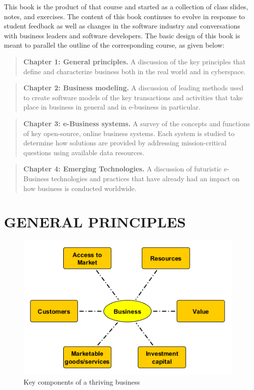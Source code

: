 \documentclass[]{book}
\begin{document}
This book is the product of that course and started as a collection of class slides, notes, and exercises. The content of this book continues to evolve in response to student feedback as well as changes in the software industry and conversations with business leaders and software developers. The basic design of this book is meant to parallel the outline of the corresponding course, as given below:

\begin{quote}
\textbf{Chapter 1: General principles.} A discussion of the key principles that define and characterize business both in the real world and in cyberspace.
\end{quote}

\begin{quote}
\textbf{Chapter 2: Business modeling.} A discussion of leading methods used to create software models of the key transactions and activities that take place in business in general and in e-business in particular.
\end{quote}

\begin{quote}
\textbf{Chapter 3: e-Business systems.} A survey of the concepts and functions of key open-source, online business systems. Each system is studied to determine how solutions are provided by addressing mission-critical questions using available data resources.
\end{quote}

\begin{quote}
\textbf{Chapter 4: Emerging Technologies.} A discussion of futuristic e-Business technologies and practices that have already had an impact on how business is conducted worldwide.
\end{quote}

\hypertarget{general-principles}{%
\chapter{GENERAL PRINCIPLES}\label{general-principles}}

\begin{figure}
\centering
\includegraphics{images/keycomponents.png}
\caption{Key components of a thriving business}
\end{figure}
\end{document}
